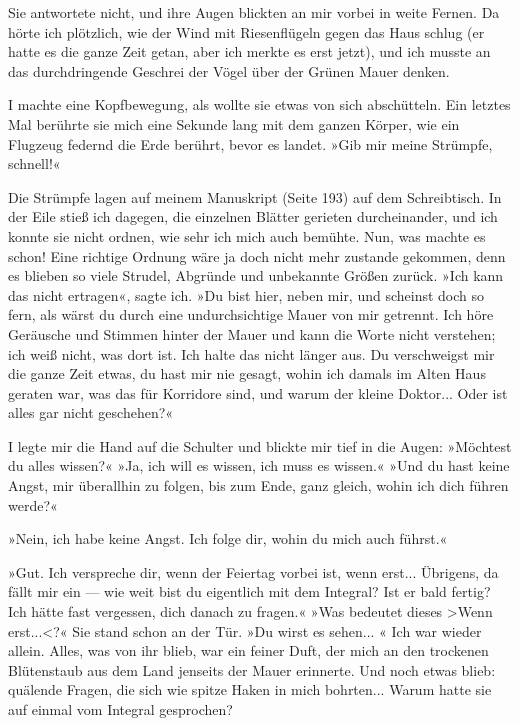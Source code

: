 Sie antwortete nicht, und ihre Augen blickten an mir vorbei in
weite Fernen. Da hörte ich plötzlich, wie der Wind mit
Riesenflügeln gegen das Haus schlug (er hatte es die ganze Zeit
getan, aber ich merkte es erst jetzt), und ich musste an das
durchdringende Geschrei der Vögel über der Grünen Mauer denken.

I machte eine Kopfbewegung, als wollte sie etwas von sich
abschütteln. Ein letztes Mal berührte sie mich eine Sekunde lang
mit dem ganzen Körper, wie ein Flugzeug federnd die Erde berührt,
bevor es landet. »Gib mir meine Strümpfe, schnell!«

Die Strümpfe lagen auf meinem Manuskript (Seite 193) auf dem
Schreibtisch. In der Eile stieß ich dagegen, die einzelnen Blätter
gerieten durcheinander, und ich konnte sie nicht ordnen, wie sehr
ich mich auch bemühte. Nun, was machte es schon! Eine richtige
Ordnung wäre ja doch nicht mehr zustande gekommen, denn es blieben
so viele Strudel, Abgründe und unbekannte Größen zurück. »Ich kann
das nicht ertragen«, sagte ich. »Du bist hier, neben mir, und
scheinst doch so fern, als wärst du durch eine undurchsichtige
Mauer von mir getrennt. Ich höre Geräusche und Stimmen hinter der
Mauer und kann die Worte nicht verstehen; ich weiß nicht, was dort
ist. Ich halte das nicht länger aus. Du verschweigst mir die ganze
Zeit etwas, du hast mir nie gesagt, wohin ich damals im Alten Haus
geraten war, was das für Korridore sind, und warum der kleine
Doktor... Oder ist alles gar nicht geschehen?«

I legte mir die Hand auf die Schulter und blickte mir tief in die
Augen: »Möchtest du alles wissen?« »Ja, ich will es wissen, ich
muss es wissen.« »Und du hast keine Angst, mir überallhin zu
folgen, bis zum Ende, ganz gleich, wohin ich dich führen werde?«

»Nein, ich habe keine Angst. Ich folge dir, wohin du mich auch
führst.«

»Gut. Ich verspreche dir, wenn der Feiertag vorbei ist, wenn
erst... Übrigens, da fällt mir ein — wie weit bist du eigentlich
mit dem Integral? Ist er bald fertig? Ich hätte fast vergessen,
dich danach zu fragen.« »Was bedeutet dieses \textgreater{}Wenn
erst...\textless{}?« Sie stand schon an der Tür. »Du wirst es
sehen... « Ich war wieder allein. Alles, was von ihr blieb, war ein
feiner Duft, der mich an den trockenen Blütenstaub aus dem Land
jenseits der Mauer erinnerte. Und noch etwas blieb: quälende
Fragen, die sich wie spitze Haken in mich bohrten... Warum hatte
sie auf einmal vom Integral gesprochen?

